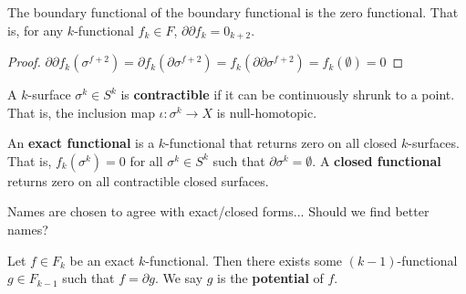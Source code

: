 \begin{coro}
	The boundary functional of the boundary functional is the zero functional. That is, for any $k$-functional $f_k \in F$, $\partial \partial f_k = 0_{k+2}$.
\end{coro}

\begin{proof}
	$\partial \partial f_k (\sigma ^{f+2}) = \partial f_k (\partial \sigma ^{f+2}) = f_k (\partial \partial \sigma ^{f+2}) = f_k(\emptyset) = 0$
\end{proof}

\begin{defn}
	A $k$-surface $\sigma^k \in S^k$ is \textbf{contractible} if it can be continuously shrunk to a point. That is, the inclusion map $\iota : \sigma^k \to X$ is null-homotopic.
\end{defn}

\begin{defn}
	An \textbf{exact functional} is a $k$-functional that returns zero on all closed $k$-surfaces. That is, $f_k(\sigma^k) = 0$ for all $\sigma^k \in S^k$ such that $\partial\sigma^k = \emptyset$. A \textbf{closed functional} returns zero on all contractible closed surfaces.
\end{defn}

\begin{remark}
	Names are chosen to agree with exact/closed forms... Should we find better names?
\end{remark}

\begin{prop}
	Let $f \in F_k$ be an exact $k$-functional. Then there exists some $(k-1)$-functional $g \in F_{k-1}$ such that $f = \partial g$. We say $g$ is the \textbf{potential} of $f$.
\end{prop}

